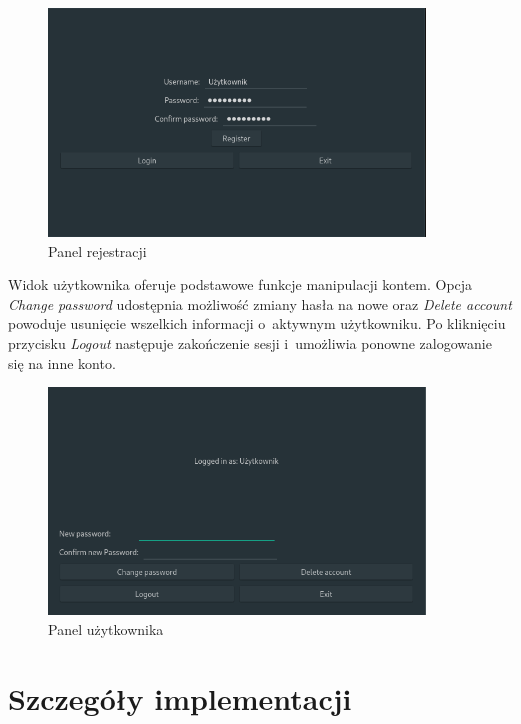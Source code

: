 \begin{figure}[h]
    \includegraphics[width=10cm]{img/UI/register.png}
    \centering
    \caption{Panel rejestracji}
    \label{img:gui-register}
\end{figure}

Widok użytkownika oferuje podstawowe funkcje manipulacji kontem. Opcja \textit{Change password} udostępnia możliwość zmiany hasła na nowe oraz \textit{Delete account} powoduje usunięcie wszelkich informacji o~aktywnym użytkowniku.
Po kliknięciu przycisku \textit{Logout} następuje zakończenie sesji i~umożliwia ponowne zalogowanie się na inne konto.

\begin{figure}[h]
    \includegraphics[width=10cm]{img/UI/user.png}
    \centering
    \caption{Panel użytkownika}
    \label{img:gui-user}
\end{figure}

\section{Szczegóły implementacji}
